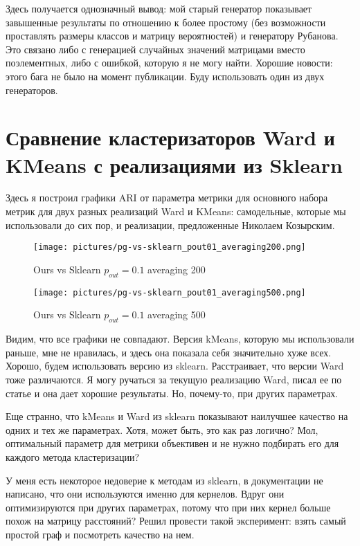 \documentclass{article}
\begin{document}
Здесь получается однозначный вывод: мой старый генератор показывает завышенные результаты по отношению к более простому (без возможности проставлять размеры классов и матрицу вероятностей) и генератору Рубанова. Это связано либо с генерацией случайных значений матрицами вместо поэлементных, либо с ошибкой, которую я не могу найти. Хорошие новости: этого бага не было на момент публикации. Буду использовать один из двух генераторов.


\section{Сравнение кластеризаторов Ward и KMeans с реализациями из Sklearn}
Здесь я построил графики ARI от параметра метрики для основного набора метрик для двух разных реализаций Ward и KMeans: самодельные, которые мы использовали до сих пор, и реализации, предложенные Николаем Козырским.

\begin{figure}[H]
	\texttt{[image: pictures/pg-vs-sklearn\_pout01\_averaging200.png]}
	\caption{\label{f_vs2} Ours vs Sklearn $p_{out}=0.1$ averaging 200}
\end{figure}

\begin{figure}[H]
	\texttt{[image: pictures/pg-vs-sklearn\_pout01\_averaging500.png]}
	\caption{\label{f_vs2} Ours vs Sklearn $p_{out}=0.1$ averaging 500}
\end{figure}

Видим, что все графики не совпадают. Версия kMeans, которую мы использовали раньше, мне не нравилась, и здесь она показала себя значительно хуже всех. Хорошо, будем использовать версию из sklearn. Расстраивает, что версии Ward тоже различаются. Я могу ручаться за текущую реализацию Ward, писал ее по статье и она дает хорошие результаты. Но, почему-то, при других параметрах. 

Еще странно, что kMeans и Ward из sklearn показывают наилучшее качество на одних и тех же параметрах. Хотя, может быть, это как раз логично? Мол, оптимальный параметр для метрики объективен и не нужно подбирать его для каждого метода кластеризации?

У меня есть некоторое недоверие к методам из sklearn, в документации не написано, что они используются именно для кернелов. Вдруг они оптимизируются при других параметрах, потому что при них кернел больше похож на матрицу расстояний? Решил провести такой эксперимент: взять самый простой граф и посмотреть качество на нем.
\end{document}

